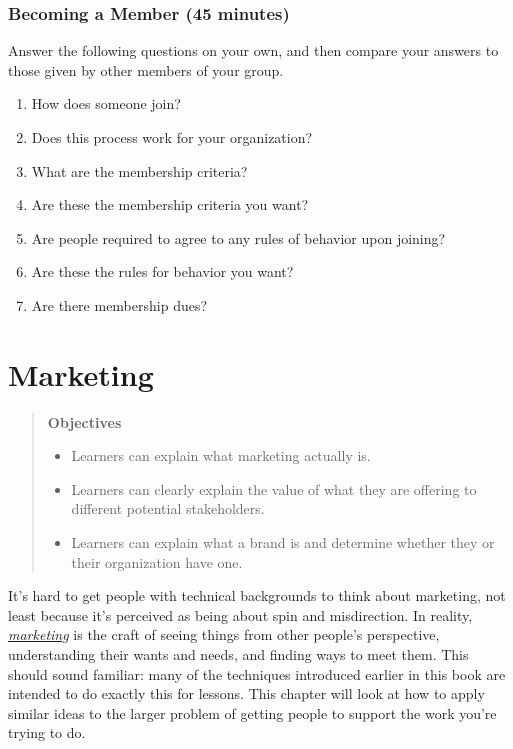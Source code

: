 \documentclass[10pt,statementpaper]{memoir}
\providecommand{\tightlist}{%
  \setlength{\itemsep}{0pt}\setlength{\parskip}{0pt}}
\begin{document}
\subsection*{Becoming a Member (45
minutes)}\label{becoming-a-member-45-minutes}

Answer the following questions on your own, and then compare your
answers to those given by other members of your group.

\begin{enumerate}
\def\labelenumi{\arabic{enumi}.}
\tightlist
\item
  How does someone join?
\item
  Does this process work for your organization?
\item
  What are the membership criteria?
\item
  Are these the membership criteria you want?
\item
  Are people required to agree to any rules of behavior upon joining?
\item
  Are these the rules for behavior you want?
\item
  Are there membership dues?
\end{enumerate}

\chapter{Marketing}\label{marketing}

\begin{quote}
\textbf{Objectives}

\begin{itemize}
\tightlist
\item
  Learners can explain what marketing actually is.
\item
  Learners can clearly explain the value of what they are offering to
  different potential stakeholders.
\item
  Learners can explain what a brand is and determine whether they or
  their organization have one.
\end{itemize}
\end{quote}

It's hard to get people with technical backgrounds to think about
marketing, not least because it's perceived as being about spin and
misdirection. In reality, \emph{\href{gloss.html\#marketing}{marketing}}
is the craft of seeing things from other people's perspective,
understanding their wants and needs, and finding ways to meet them. This
should sound familiar: many of the techniques introduced earlier in this
book are intended to do exactly this for lessons. This chapter will look
at how to apply similar ideas to the larger problem of getting people to
support the work you're trying to do.
\end{document}
